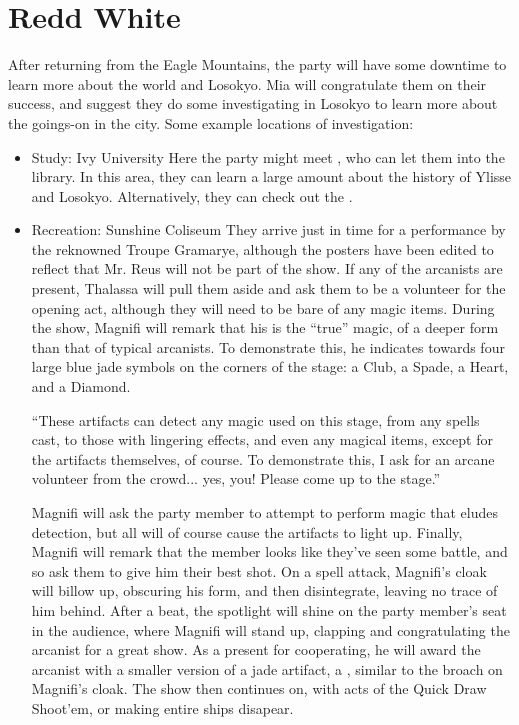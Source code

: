 \section{Redd White}
After returning from the Eagle Mountains, the party will have some downtime to learn more about the world and Losokyo. Mia will congratulate them on their success, and suggest they do some investigating in Losokyo to learn more about the goings-on in the city. Some example locations of investigation:
\begin{itemize}
\item Study: Ivy University
Here the party might meet , who can let them into the library. In this area, they can learn a large amount about the history of Ylisse and Losokyo. Alternatively, they can check out the .
\item Recreation: Sunshine Coliseum
They arrive just in time for a performance by the reknowned Troupe Gramarye, although the posters have been edited to reflect that Mr. Reus will not be part of the show. If any of the arcanists are present, Thalassa will pull them aside and ask them to be a volunteer for the opening act, although they will need to be bare of any magic items. During the show, Magnifi will remark that his is the ``true'' magic, of a deeper form than that of typical arcanists. To demonstrate this, he indicates towards four large blue jade symbols on the corners of the stage: a Club, a Spade, a Heart, and a Diamond. 
\begin{center}
``These artifacts can detect any magic used on this stage, from any spells cast, to those with lingering effects, and even any magical items, except for the artifacts themselves, of course. To demonstrate this, I ask for an arcane volunteer from the crowd... yes, you! Please come up to the stage.''
\end{center}
Magnifi will ask the party member to attempt to perform magic that eludes detection, but all will of course cause the artifacts to light up. Finally, Magnifi will remark that the member looks like they've seen some battle, and so ask them to give him their best shot. On a spell attack, Magnifi's cloak will billow up, obscuring his form, and then disintegrate, leaving no trace of him behind. After a beat, the spotlight will shine on the party member's seat in the audience, where Magnifi will stand up, clapping and congratulating the arcanist for a great show. As a present for cooperating, he will award the arcanist with a smaller version of a jade artifact, a , similar to the broach on Magnifi's cloak. The show then continues on, with acts of the Quick Draw Shoot'em, or making entire ships disapear.


\end{itemize}
